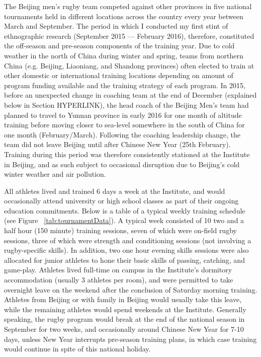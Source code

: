 \begin{CJK}{UTF8}{gbsn}
   The Beijing men's rugby team competed against other provinces in five national tournaments held in different locations across the country   every year between March and September. The period in which I conducted my first stint of ethnographic research (September 2015 –-- February 2016), therefore, constituted the off-season and pre-season components of the training year.  Due to cold weather in the north of China during winter and spring, teams from northern China (e.g. Beijing, Liaoniang, and Shandong provinces) often elected to train   at other domestic or international training locations depending on amount of program funding available and the training strategy of each program.  In 2015, before an unexpected change in coaching team at the end of December (explained below in Section HYPERLINK), the head coach of the Beijing Men's team had planned to travel to Yunnan province in early 2016 for one month of altitude training before moving closer to sea-level somewhere in the south of China for one month (February/March).  Following the coaching leadership change, the team did not leave Beijing until after Chinese New Year (25th February). Training during this period was therefore consistently stationed at the Institute in Beijing, and as such subject to occasional disruption due to Beijing's cold winter weather and air pollution.

   All athletes lived and trained 6 days a week at the Institute, and would occasionally attend university or high school classes as part of their ongoing education commitments.  Below is a table of a typical weekly training schedule (see Figure ~\ref{tab:tournamentData}). A typical week consisted of 10 two and a half hour (150 minute) training sessions, seven of which were on-field rugby sessions, three of which were strength and conditioning sessions (not involving a rugby-specific skills).  In addition, two one hour evening skills sessions were also allocated for junior athletes to hone their basic skills of passing, catching, and game-play.  Athletes lived full-time on campus in the Institute's dormitory accommodation (usually 3 athletes per room), and were permitted to take overnight leave on the weekend after the conclusion of Saturday morning training.  Athletes from Beijing or with family in Beijing would usually take this leave, while the remaining athletes would spend weekends at the Institute.  Generally speaking, the rugby program would break at the end of the national season in September for two weeks, and occasionally around Chinese New Year for 7-10 days, unless New Year interrupts pre-season training plans, in which case training would continue in spite of this national holiday.


\end{CJK}
